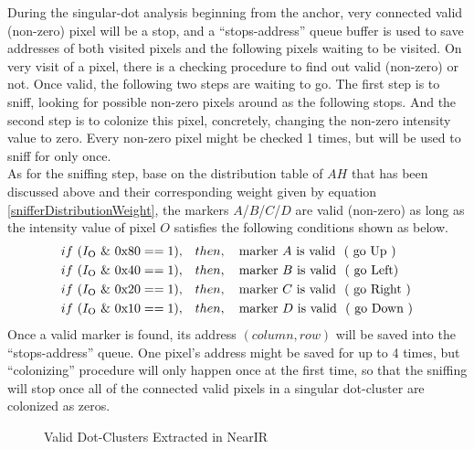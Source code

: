 %
During the singular-dot analysis beginning from the anchor, very connected valid (non-zero) pixel will be a stop, and a \enquote{stops-address} queue buffer is used to save addresses of both visited pixels and the following pixels waiting to be visited. On very visit of a pixel, there is a checking procedure to find out valid (non-zero) or not. Once valid, the following two steps are waiting to go. The first step is to sniff, looking for possible non-zero pixels around as the following stops. And the second step is to colonize this pixel, concretely, changing the non-zero intensity value to zero. Every non-zero pixel might be checked 1 times, but will be used to sniff for only once.%
\\\indent%
As for the sniffing step, base on the distribution table of \(A\)\texttildelow \(H\) that has been discussed above and their corresponding weight given by equation \ref{snifferDistributionWeight}, the markers \(A\)/\(B\)/\(C\)/\(D\) are valid (non-zero) as long as the intensity value of pixel \(O\) satisfies the following conditions shown as below.%
%
\begin{equation*}
%
\begin{aligned}
if \,\, ( I_{\text{O}} \,\, \& \,\, \text{0x80}  == 1 ),\quad &then, \quad \text{marker } A\,\, \text{is valid \,\,( go Up )}%
\\%
if \,\, ( I_{\text{O}} \,\, \& \,\, \text{0x40}  == 1 ),\quad &then, \quad \text{marker } B\,\, \text{is valid \,\,( go  Left)}%
\\%
if \,\, ( I_{\text{O}} \,\, \& \,\, \text{0x20}  == 1 ),\quad &then, \quad \text{marker } C\,\,\text{is valid \,\,( go Right )}%
\\%
if \,\, ( I_{\text{O}} \,\, \& \,\, \text{0x10}  == 1 ),\quad &then,\quad \text{marker } D\,\,\text{is valid \,\,( go Down )}%
\\%
\end{aligned}
%
\end{equation*}%
%
\noindent
Once a valid marker is found, its address \((column, row)\) will be saved into the \enquote{stops-address} queue. One pixel's address might be saved for up to 4 times, but \enquote{colonizing} procedure will only happen once at the first time, so that the sniffing will stop once all of the connected valid pixels in a singular dot-cluster are colonized as zeros.%
%
 \begin{figure}[t]
\hspace*{-0.5cm}
\centering
{}
{}
%
\caption{Valid Dot-Clusters Extracted in NearIR}
\label{DotCentersExtraction}
\end{figure}

